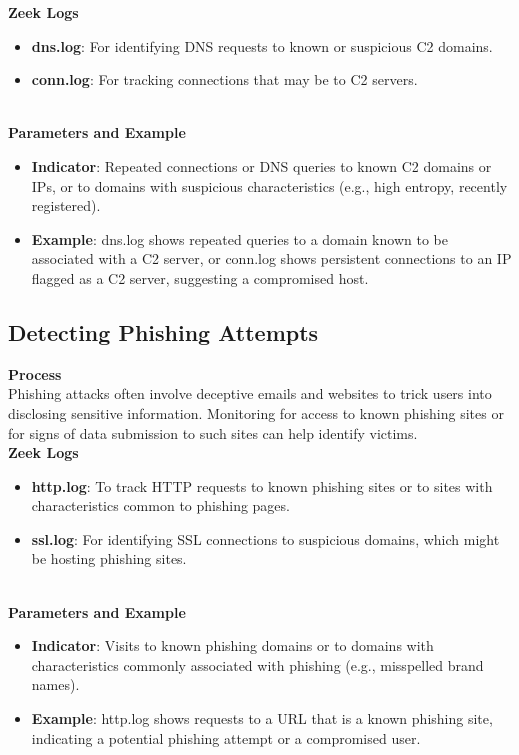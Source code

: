 \noindent \textbf{Zeek Logs}
\begin{itemize}
    \item \textbf{dns.log}: For identifying DNS requests to known or suspicious C2 domains.
    \item \textbf{conn.log}: For tracking connections that may be to C2 servers.
\end{itemize}
\vspace{10pt}
\\

\noindent \textbf{Parameters and Example}
\begin{itemize}
    \item \textbf{Indicator}: Repeated connections or DNS queries to known C2 domains or IPs, or to domains with suspicious characteristics (e.g., high entropy, recently registered).
    \item \textbf{Example}: dns.log shows repeated queries to a domain known to be associated with a C2 server, or conn.log shows persistent connections to an IP flagged as a C2 server, suggesting a compromised host.
\end{itemize}

\vspace{8pt}
\subsection{Detecting Phishing Attempts}
\textbf{Process}
\vspace{8pt}
\\
Phishing attacks often involve deceptive emails and websites to trick users into disclosing sensitive information. Monitoring for access to known phishing sites or for signs of data submission to such sites can help identify victims.
\vspace{10pt}
\\

\noindent \textbf{Zeek Logs}
\begin{itemize}
    \item \textbf{http.log}: To track HTTP requests to known phishing sites or to sites with characteristics common to phishing pages.
    \item \textbf{ssl.log}: For identifying SSL connections to suspicious domains, which might be hosting phishing sites.
\end{itemize}
\vspace{10pt}
\\

\noindent \textbf{Parameters and Example}
\begin{itemize}
    \item \textbf{Indicator}: Visits to known phishing domains or to domains with characteristics commonly associated with phishing (e.g., misspelled brand names).
    \item \textbf{Example}: http.log shows requests to a URL that is a known phishing site, indicating a potential phishing attempt or a compromised user.
\end{itemize}

